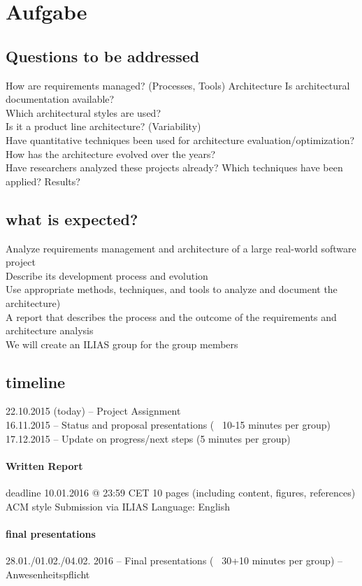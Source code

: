 \section{Aufgabe}
\subsection{Questions to be addressed}
How are requirements managed? (Processes, Tools)  Architecture
 Is architectural documentation available?\\
 Which architectural styles are used?\\
 Is it a product line architecture? (Variability)\\
 Have quantitative techniques been used for architecture
evaluation/optimization?\\
 How has the architecture evolved over the years?\\
 Have researchers analyzed these projects already? Which
techniques have been applied? Results?

\subsection{what is expected?}
Analyze requirements management and architecture of a large real-world software project \\
 Describe its development process and evolution \\
 Use appropriate methods, techniques, and tools to analyze and
document the architecture) \\
 A report that describes the process and the outcome of the
requirements and architecture analysis\\
 We will create an ILIAS group for the group members
 
 \subsection{timeline}
  22.10.2015 (today) – Project Assignment\\
 16.11.2015 – Status and proposal presentations
(~ 10-15 minutes per group)  17.12.2015 – Update on progress/next steps
(5 minutes per group)\\
\paragraph{Written Report}
 deadline 10.01.2016 @ 23:59 CET 
 10 pages (including content, figures, references) ACM style  Submission via ILIAS
 Language: English
 
 \paragraph{final presentations}
 28.01./01.02./04.02. 2016 – Final presentations
(~ 30+10 minutes per group) – Anwesenheitspflicht